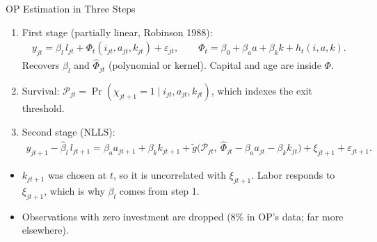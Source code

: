 \documentclass[aspectratio=169,10pt]{beamer}
\begin{document}
\begin{frame}{OP Estimation in Three Steps}
\begin{enumerate}
\item \alert{First stage} (partially linear, Robinson 1988):
\begin{align*}
y_{jt} = \beta_l\, l_{jt} + \Phi_t(i_{jt}, a_{jt}, k_{jt}) + \varepsilon_{jt}, \qquad \Phi_t = \beta_0 + \beta_a a + \beta_k k + h_t(i, a, k).
\end{align*}
Recovers $\hat\beta_l$ and $\hat\Phi_{jt}$ (polynomial or kernel). Capital and age are inside $\Phi$.
\item \alert{Survival}: $\mathcal{P}_{jt} = \Pr(\chi_{jt+1} = 1 \mid i_{jt}, a_{jt}, k_{jt})$, which indexes the exit threshold.
\item \alert{Second stage} (NLLS):
\begin{align*}
y_{jt+1} - \hat\beta_l\, l_{jt+1} = \beta_a a_{jt+1} + \beta_k k_{jt+1} + \tilde g\big(\mathcal{P}_{jt},\ \hat\Phi_{jt} - \beta_a a_{jt} - \beta_k k_{jt}\big) + \xi_{jt+1} + \varepsilon_{jt+1}.
\end{align*}
\end{enumerate}
\begin{itemize}
\item $k_{jt+1}$ was chosen at $t$, so it is uncorrelated with $\xi_{jt+1}$. Labor responds to $\xi_{jt+1}$, which is why $\beta_l$ comes from step 1.
\item Observations with zero investment are dropped (8\% in OP's data; far more elsewhere).
\end{itemize}
\end{frame}
\end{document}
